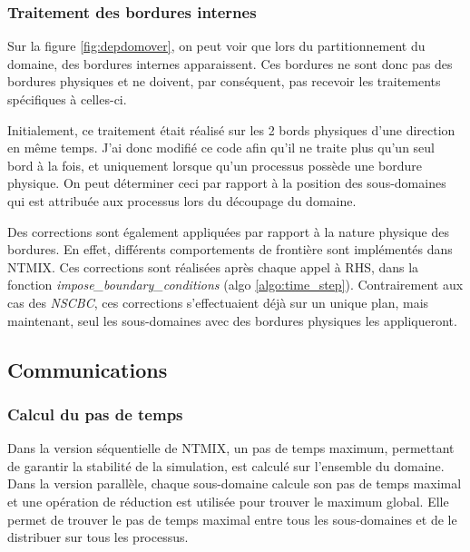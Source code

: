 \subsubsection{Traitement des bordures internes}
Sur la figure \ref{fig:depdomover}, on peut voir que lors du partitionnement du domaine, des bordures internes apparaissent. Ces bordures ne sont donc pas des bordures physiques et ne doivent, par conséquent, pas recevoir les traitements spécifiques à celles-ci.

Initialement, ce traitement était réalisé sur les 2 bords physiques d'une direction en même temps.
J'ai donc modifié ce code afin qu'il ne traite plus qu'un seul bord à la fois, et uniquement lorsque qu'un processus possède une bordure physique. On peut déterminer ceci par rapport à la position des sous-domaines qui est attribuée aux processus lors du découpage du domaine.

Des corrections sont également appliquées par rapport à la nature physique des bordures. En effet, différents comportements de frontière sont implémentés dans NTMIX. Ces corrections sont réalisées après chaque appel à RHS, dans la fonction \textit{impose\_boundary\_conditions} (algo \ref{algo:time_step}). Contrairement aux cas des \textit{NSCBC}, ces corrections s'effectuaient déjà sur un unique plan, mais maintenant, seul les sous-domaines avec des bordures physiques les appliqueront.


\subsection{Communications}\label{sec:comms}

\subsubsection{Calcul du pas de temps}
Dans la version séquentielle de NTMIX, un pas de temps maximum, permettant de garantir la stabilité de la simulation, est calculé sur l'ensemble du domaine.
Dans la version parallèle, chaque sous-domaine calcule son pas de temps maximal et une opération de réduction est utilisée pour trouver le maximum global. Elle permet de trouver le pas de temps maximal entre tous les sous-domaines et de le distribuer sur tous les processus.

